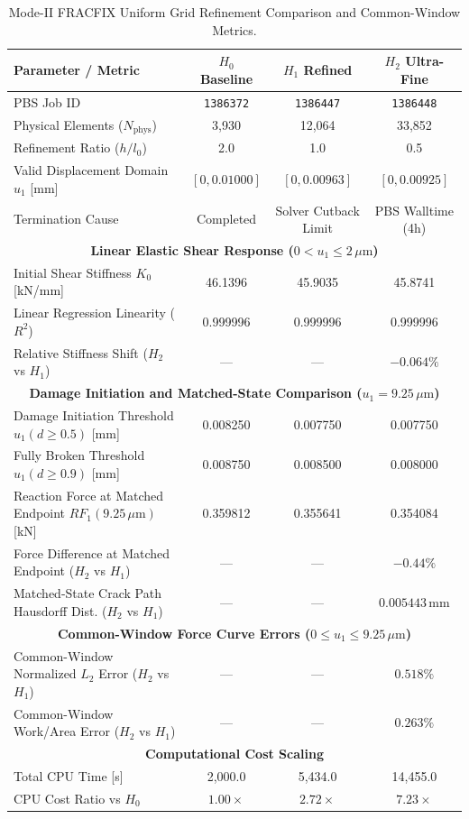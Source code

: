 \begin{table}[htbp]
\centering
\small
\caption{Mode-II FRACFIX Uniform Grid Refinement Comparison and Common-Window Metrics.}
\label{tab:mode_ii_fracfix_convergence}
\begin{tabular}{lccc}
\toprule
\textbf{Parameter / Metric} & \textbf{$H_0$ Baseline} & \textbf{$H_1$ Refined} & \textbf{$H_2$ Ultra-Fine} \\
\midrule
PBS Job ID & \texttt{1386372} & \texttt{1386447} & \texttt{1386448} \\
Physical Elements ($N_{\text{phys}}$) & 3,930 & 12,064 & 33,852 \\
Refinement Ratio ($h/l_0$) & 2.0 & 1.0 & 0.5 \\
Valid Displacement Domain $u_1$ [mm] & $[0, 0.01000]$ & $[0, 0.00963]$ & $[0, 0.00925]$ \\
Termination Cause & Completed & Solver Cutback Limit & PBS Walltime (4h) \\
\midrule
\multicolumn{4}{c}{\textbf{Linear Elastic Shear Response ($0 < u_1 \le 2\,\mu\text{m}$)}} \\
Initial Shear Stiffness $K_0$ [kN/mm] & 46.1396 & 45.9035 & 45.8741 \\
Linear Regression Linearity ($R^2$) & 0.999996 & 0.999996 & 0.999996 \\
Relative Stiffness Shift ($H_2$ vs $H_1$) & --- & --- & $\mathbf{-0.064\%}$ \\
\midrule
\multicolumn{4}{c}{\textbf{Damage Initiation and Matched-State Comparison ($u_1 = 9.25\,\mu\text{m}$)}} \\
Damage Initiation Threshold $u_1(d \ge 0.5)$ [mm] & 0.008250 & 0.007750 & 0.007750 \\
Fully Broken Threshold $u_1(d \ge 0.9)$ [mm] & 0.008750 & 0.008500 & 0.008000 \\
Reaction Force at Matched Endpoint $RF_1(9.25\,\mu\text{m})$ [kN] & 0.359812 & 0.355641 & 0.354084 \\
Force Difference at Matched Endpoint ($H_2$ vs $H_1$) & --- & --- & $\mathbf{-0.44\%}$ \\
Matched-State Crack Path Hausdorff Dist. ($H_2$ vs $H_1$) & --- & --- & $0.005443\,\text{mm}$ \\
\midrule
\multicolumn{4}{c}{\textbf{Common-Window Force Curve Errors ($0 \le u_1 \le 9.25\,\mu\text{m}$)}} \\
Common-Window Normalized $L_2$ Error ($H_2$ vs $H_1$) & --- & --- & $\mathbf{0.518\%}$ \\
Common-Window Work/Area Error ($H_2$ vs $H_1$) & --- & --- & $\mathbf{0.263\%}$ \\
\midrule
\multicolumn{4}{c}{\textbf{Computational Cost Scaling}} \\
Total CPU Time [s] & 2,000.0 & 5,434.0 & 14,455.0 \\
CPU Cost Ratio vs $H_0$ & $1.00\times$ & $2.72\times$ & $7.23\times$ \\
\bottomrule
\end{tabular}
\end{table}

